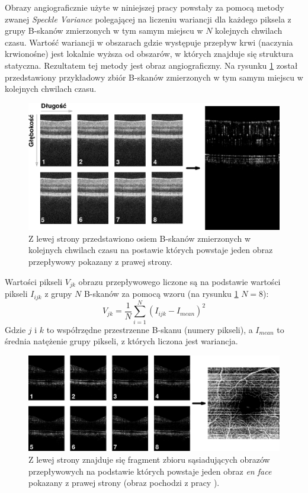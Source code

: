 Obrazy angiograficznie użyte w niniejszej pracy powstały za pomocą metody zwanej \textit{Speckle Variance} polegającej na liczeniu wariancji dla każdego piksela z grupy B-skanów zmierzonych w tym samym miejscu w $N$ kolejnych chwilach czasu. Wartość wariancji w obszarach gdzie występuje przepływ krwi (naczynia krwionośne) jest lokalnie wyższa od obszarów, w których znajduje się struktura statyczna. Rezultatem tej metody jest obraz angiograficzny. Na rysunku \ref{fig:obrazowanie_oct:speckle_variance} został przedstawiony przykładowy zbiór B-skanów zmierzonych w tym samym miejscu w kolejnych chwilach czasu.

\begin{figure}[H]
	\centering
	\includegraphics[width=\textwidth]{gfx/speckle_variance}
	\caption{Z lewej strony przedstawiono osiem B-skanów zmierzonych w kolejnych chwilach czasu na postawie których powstaje jeden obraz przepływowy pokazany z prawej strony.}
	\label{fig:obrazowanie_oct:speckle_variance}
\end{figure}

Wartości pikseli $V_{jk}$ obrazu przepływowego liczone są na podstawie wartości pikseli $I_{ijk}$ z grupy $N$ B-skanów za pomocą wzoru (na rysunku \ref{fig:obrazowanie_oct:speckle_variance} $N=8$):
\begin{equation}
V_{jk} = \frac{1}{N} \displaystyle\sum_{i=1}^{N}(I_{ijk} - I_{mean})^2
\end{equation}
Gdzie $j$ i $k$ to współrzędne przestrzenne B-skanu (numery pikseli), a $I_{mean}$ to średnia natężenie grupy pikseli, z których liczona jest wariancja.

\begin{figure}[H]
	\centering
	\includegraphics[width=\textwidth]{gfx/en_face_sv}
	\caption{Z lewej strony znajduje się fragment zbioru sąsiadujących obrazów przepływowych na podstawie których powstaje jeden obraz \textit{en face} pokazany z prawej strony (obraz pochodzi z pracy \cite{Ruminski:15}).}
	\label{fig:obrazowanie_oct:en_face_sv}
\end{figure}

